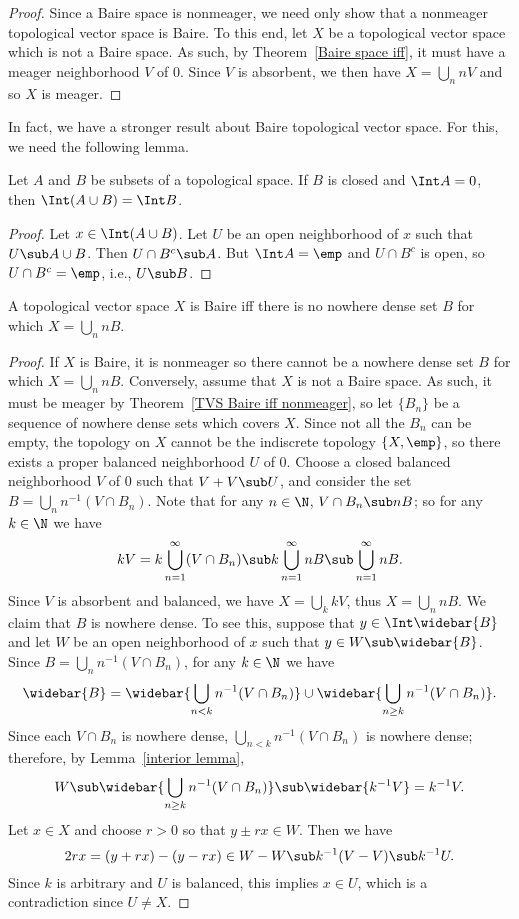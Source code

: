 \begin{proof}
Since a Baire space is nonmeager, we need only show that a nonmeager topological vector space is Baire. To this end, let $X$ be a topological vector space which is not a Baire space. As such, by Theorem~\ref{Baire space iff}, it must have a meager neighborhood $V$ of $0$. Since $V$ is absorbent, we then have $X=\bigcup_nnV$ and so $X$ is meager.
\end{proof}
In fact, we have a stronger result about Baire topological vector space. For this, we need the following lemma.
\begin{lemma}\label{interior lemma}
Let $A$ and $B$ be subsets of a topological space. If $B$ is closed and $\Int A=0$, then $\Int(A\cup B)=\Int B$.
\end{lemma}
\begin{proof}
Let $x\in\Int(A\cup B)$. Let $U$ be an open neighborhood of $x$ such that $U\sub A\cup B$. Then $U\cap B^c\sub A$. But $\Int A=\emp$ and $U\cap B^c$ is open, so $U\cap B^c=\emp$, i.e., $U\sub B$.
\end{proof}
\begin{proposition}\label{TVS Baire iff not covered by multiple of nowhere dense}
A topological vector space $X$ is Baire iff there is no nowhere dense set $B$ for which $X=\bigcup_nnB$.
\end{proposition}
\begin{proof}
If $X$ is Baire, it is nonmeager so there cannot be a nowhere dense set $B$ for which $X=\bigcup_nnB$. Conversely, assume that $X$ is not a Baire space. As such, it must be meager by Theorem~\ref{TVS Baire iff nonmeager}, so let $\{B_n\}$ be a sequence of nowhere dense sets which covers $X$. Since not all the $B_n$ can be empty, the topology on $X$ cannot be the indiscrete topology $\{X,\emp\}$, so there exists a proper balanced neighborhood $U$ of $0$. Choose a closed balanced neighborhood $V$ of $0$ such that $V+V\sub U$, and consider the set $B=\bigcup_{n}n^{-1}(V\cap B_n)$. Note that for any $n\in\N$, $V\cap B_n\sub nB$; so for any $k\in\N$ we have
\[kV=k\bigcup_{n=1}^{\infty}(V\cap B_n)\sub k\bigcup_{n=1}^{\infty}nB\sub\bigcup_{n=1}^{\infty}nB.\]
Since $V$ is absorbent and balanced, we have $X=\bigcup_kkV$, thus $X=\bigcup_nnB$. We claim that $B$ is nowhere dense. To see this, suppose that $y\in\Int\widebar{B}$ and let $W$ be an open neighborhood of $x$ such that $y\in W\sub\widebar{B}$. Since $B=\bigcup_nn^{-1}(V\cap B_n)$, for any $k\in\N$ we have
\[\widebar{B}=\widebar{\bigcup_{n<k}n^{-1}(V\cap B_n)}\cup\widebar{\bigcup_{n\geq k}n^{-1}(V\cap B_n)}.\]
Since each $V\cap B_n$ is nowhere dense, $\bigcup_{n<k}n^{-1}(V\cap B_n)$ is nowhere dense; therefore, by Lemma~\ref{interior lemma},
\[W\sub\widebar{\bigcup_{n\geq k}n^{-1}(V\cap B_n)}\sub\widebar{k^{-1}V}=k^{-1}V.\]
Let $x\in X$ and choose $r>0$ so that $y\pm rx\in W$. Then we have
\[2rx=(y+rx)-(y-rx)\in W-W\sub k^{-1}(V-V)\sub k^{-1}U.\]
Since $k$ is arbitrary and $U$ is balanced, this implies $x\in U$, which is a contradiction since $U\neq X$.
\end{proof}
